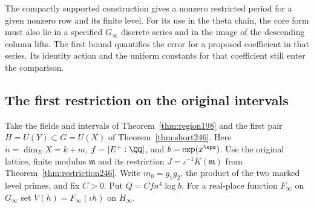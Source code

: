 \documentclass[a4paper,11pt]{article}
\theoremstyle{definition}
\theoremstyle{remark}
\numberwithin{equation}{section}
\begin{document}
The compactly supported construction gives a nonzero restricted
period for a given nonzero row and its finite level. For its use
in the theta chain, the core form must also lie in a specified
\(G_\infty\) discrete series and in the image of the descending
column lifts. The first bound quantifies the error for a proposed
coefficient in that series. Its identity action and the uniform
constants for that coefficient still enter the comparison.

\subsection{The first restriction on the original intervals}\label{nav:I-53}
Take the fields and intervals of Theorem~\ref{thm:region198} and the
first pair \(H=U(Y)\subset G=U(X)\) of Theorem~\ref{thm:short246}.
Here \(n=\dim_E X=k+m\), \(f=[E^+:\QQ]\), and \(b=\exp(x^\eps)\).
Use the original lattice, finite modulus \(\mathfrak m\) and its
restriction \(J=\iota^{-1}K(\mathfrak m)\) from
Theorem~\ref{thm:restriction246}. Write \(m_0=g_1g_2\), the product
of the two marked level primes, and fix \(C>0\). Put
\(Q=C f n^4\log b\). For a real-place function \(F_\infty\) on
\(G_\infty\) set \(V(h)=F_\infty(\iota h)\) on \(H_\infty\).
\end{document}
